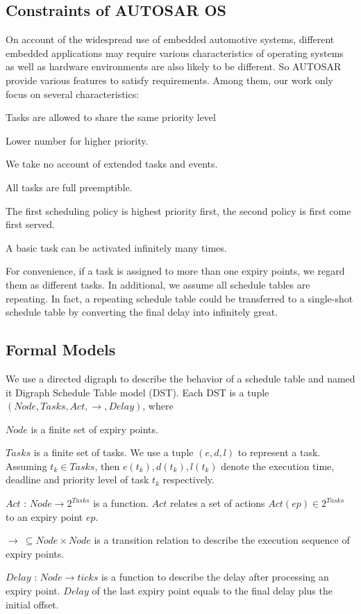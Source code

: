 \documentclass[sigconf]{acmart}
\begin{document}
\subsection{Constraints of AUTOSAR OS}
On account of the widespread use of embedded automotive systems, different embedded applications may require various characteristics of operating systems as well as hardware environments are also likely to be different. So AUTOSAR provide various features to satisfy requirements. Among them, our work only focus on several characteristics: 
\begin{compactenum}
  \item Tasks are allowed to share the same priority level
  \item Lower number for higher priority.
  \item We take no account of extended tasks and events.
  \item All tasks are full preemptible.
  \item The first scheduling policy is highest priority first, the second policy is first come first served.
  \item A basic task can be activated infinitely many times. 
\end{compactenum}

For convenience, if a task is assigned to more than one expiry points, we regard them as different tasks. In additional, we assume all schedule tables are repeating. In fact, a repeating schedule table could be transferred to a single-shot schedule table by converting the final delay into infinitely great.

\subsection{Formal Models}
We use a directed digraph to describe the behavior of a schedule table and named it Digraph Schedule Table model (DST). Each DST is a tuple $(Node,Tasks,Act,\rightarrow,Delay)$, where
\begin{compactitem}
  \item $Node$ is a finite set of expiry points.
  \item $Tasks$ is a finite set of tasks. We use a tuple $(e,d,l)$ to represent a task. Assuming $t_k\in Tasks$, then $e(t_k),d(t_k),l(t_k)$ denote the execution time, deadline and priority level of task $t_k$ respectively.%
  \item $Act$ : $Node \rightarrow 2^{Tasks}$ is a function. $Act$ relates a set of actions $Act(ep)\in 2^{Tasks}$ to an expiry point $ep$.
  \item $\rightarrow\ \subseteq Node\times Node$ is a transition relation to describe the execution sequence of expiry points. 
  \item $Delay$ : $Node \rightarrow ticks$ is a function to describe the delay after processing an expiry point. $Delay$ of the last expiry point equals to the final delay plus the initial offset.
\end{compactitem}
\end{document}
